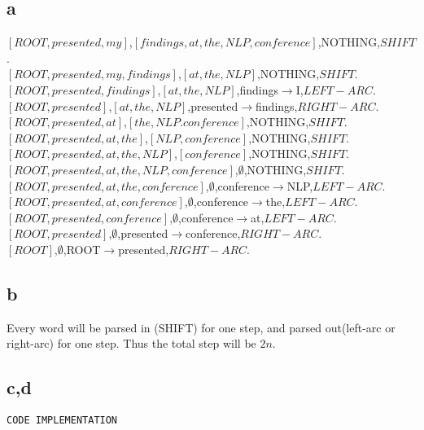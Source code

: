\documentclass{article}
\begin{document}
\subsection*{a}
$[ROOT,presented,my]$,$[findings,at,the,NLP,conference]$,NOTHING,$SHIFT$.\\
$[ROOT,presented,my,findings]$,$[at,the,NLP]$,NOTHING,$SHIFT$.\\
$[ROOT,presented,findings]$,$[at,the,NLP]$,findings$\to$I,$LEFT-ARC$.\\
$[ROOT,presented]$,$[at,the,NLP]$,presented$\to$findings,$RIGHT-ARC$.\\
$[ROOT,presented,at]$,$[the,NLP.conference]$,NOTHING,$SHIFT$.\\
$[ROOT,presented,at,the]$,$[NLP,conference]$,NOTHING,$SHIFT$.\\
$[ROOT,presented,at,the,NLP]$,$[conference]$,NOTHING,$SHIFT$.\\
$[ROOT,presented,at,the,NLP,conference]$,$\emptyset$,NOTHING,$SHIFT$.\\
$[ROOT,presented,at,the,conference]$,$\emptyset$,conference$\to$NLP,$LEFT-ARC$.\\
$[ROOT,presented,at,conference]$,$\emptyset$,conference$\to$the,$LEFT-ARC$.\\
$[ROOT,presented,conference]$,$\emptyset$,conference$\to$at,$LEFT-ARC$.\\
$[ROOT,presented]$,$\emptyset$,presented$\to$conference,$RIGHT-ARC$.\\
$[ROOT]$,$\emptyset$,ROOT$\to$presented,$RIGHT-ARC$.\\
\subsection*{b}
Every word will be parsed in (SHIFT) for one step, and parsed out(left-arc or right-arc) for one step. Thus the total step will be $2n$.\\
\subsection*{c,d}
\texttt{CODE IMPLEMENTATION}
\end{document}
